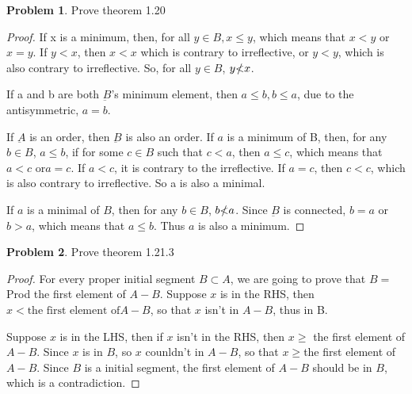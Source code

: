 \documentclass[a4paper,11pt]{article}%
\theoremstyle{remark}
\theoremstyle{definition}
\newtheorem{problem}{Problem}[subsection]
\begin{document}
\begin{problem}
    Prove theorem 1.20
    \begin{proof}
        If x is a minimum, then, for all $y\in B,x\leq y$, which means that
        $x<y$ or  $x=y$. If $y<x$, then $x<x$ which is contrary to irreflective,
        or $y<y$, which is also contrary to irreflective. So, for all $y\in B$,
        $y\slashed{<}x$.

        If a and b are both $\underbar{B}$'s minimum element, then $a\leq b,b\leq a$,
        due to the antisymmetric, $a=b$.

        If $\underbar{A}$ is an order, then $\underbar{B}$ is also an order.
        If $a$ is a minimum of B, then, for any $b\in B$, $a\leq b$, if for some 
        $c\in B$ such that $c<a$, then $a\leq c$, which means that $a<c$ or$a= c$.
        If $a<c$, it is contrary to the irreflective. If $a=c$, then $c<c$, which is 
        also contrary to irreflective. So a is also a minimal. 
        
        If $a$ is a minimal of $B$, then for any $b\in B$, $b\slashed{<}a$.
        Since $\underbar{B}$ is connected, $b=a$ or $b>a$, which means that $a\leq b$.
        Thus $a$ is also a minimum.
    \end{proof}
\end{problem}
\begin{problem}
    Prove theorem 1.21.3
    \begin{proof}
        For every proper initial segment $B\subset A$,
        we are going to prove that $B=$ Prod the first element of $A-B$.
        Suppose $x$ is in the RHS, then $x<\text{the first element of} A-B$,
        so that $x$ isn't in $A-B$, thus in B.

        Suppose $x$ is in the LHS, then if $x$ isn't in the RHS, then $x\geq $
        the first element of $A-B$. Since $x$ is in $B$, so $x$ counldn't in $A-B$,
        so that $x\geq $the first element of $A-B$. Since $B$ is a initial segment,
        the first element of $A-B$ should be in $B$, which is a contradiction.
    \end{proof}
\end{problem}
\end{document}
